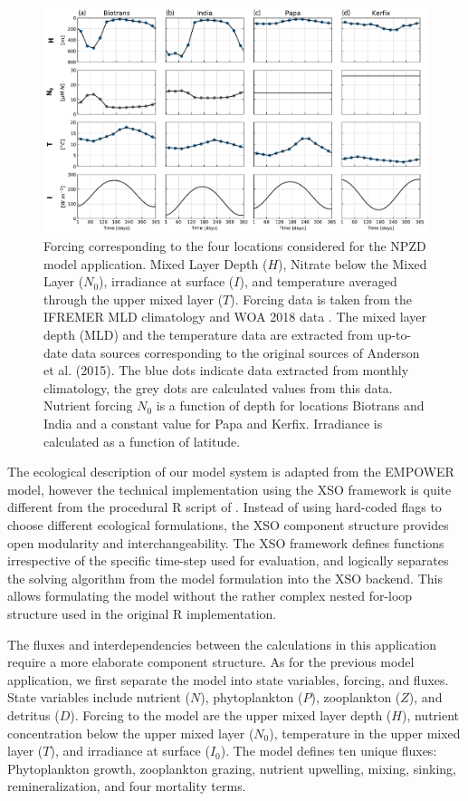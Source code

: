 \documentclass[journal abbreviation, manuscript]{copernicus}
\begin{document}
\begin{figure}[t]
\includegraphics[width=15cm]{Figures/firstdraft_plots/02_EMPOWER_forcing.pdf}
\caption{Forcing corresponding to the four locations considered for the NPZD model application. Mixed Layer Depth ($H$), Nitrate below the Mixed Layer ($N_0$), irradiance at surface ($I$), and temperature averaged through the upper mixed layer ($T$). Forcing data is taken from the IFREMER MLD climatology \citep{DeBoyerMontegut2004} and WOA 2018 data \citep{Garcia2019WORLDSilicate}. The mixed layer depth (MLD) and the temperature data are extracted from up-to-date data sources corresponding to the original sources of Anderson et al. (2015). The blue dots indicate data extracted from monthly climatology, the grey dots are calculated values from this data. Nutrient forcing $N_0$ is a function of depth for locations Biotrans and India and a constant value for Papa and Kerfix. Irradiance is calculated as a function of latitude.}
\label{Figure:EMPOWERforcing}
\end{figure}

The ecological description of our model system is adapted from the EMPOWER model, however the technical implementation using the XSO framework is quite different from the procedural R script of \citet{Anderson2015c}. Instead of using hard-coded flags to choose different ecological formulations, the XSO component structure provides open modularity and interchangeability. The XSO framework defines functions irrespective of the specific time-step used for evaluation, and logically separates the solving algorithm from the model formulation into the XSO backend. This allows formulating the model without the rather complex nested for-loop structure used in the original R implementation.

The fluxes and interdependencies between the calculations in this application require a more elaborate component structure. As for the previous model application, we first separate the model into state variables, forcing, and fluxes.  State variables include nutrient ($N$), phytoplankton ($P$), zooplankton ($Z$), and detritus ($D$). Forcing to the model are the upper mixed layer depth ($H$), nutrient concentration below the upper mixed layer ($N_0$), temperature in the upper mixed layer ($T$), and irradiance at surface ($I_{0}$). The model defines ten unique fluxes: Phytoplankton growth, zooplankton grazing, nutrient upwelling, mixing, sinking, remineralization, and four mortality terms.
\end{document}
